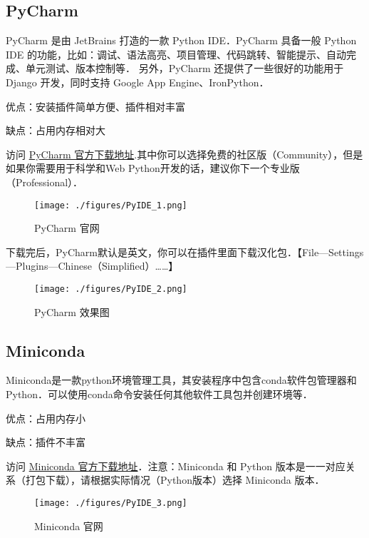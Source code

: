 
\begin{issues}
\issueTODO
\end{issues}

\subsection{PyCharm}

PyCharm 是由 JetBrains 打造的一款 Python IDE．PyCharm 具备一般 Python IDE 的功能，比如：调试、语法高亮、项目管理、代码跳转、智能提示、自动完成、单元测试、版本控制等． 另外，PyCharm 还提供了一些很好的功能用于 Django 开发，同时支持 Google App Engine、IronPython．

优点：安装插件简单方便、插件相对丰富

缺点：占用内存相对大

访问 \href{http://www.jetbrains.com/pycharm/download/}{PyCharm 官方下载地址}.其中你可以选择免费的社区版（Community），但是如果你需要用于科学和Web Python开发的话，建议你下一个专业版（Professional）．

\begin{figure}[ht]
\centering
\texttt{[image: ./figures/PyIDE\_1.png]}
\caption{PyCharm 官网} \label{PyIDE_fig1}
\end{figure}

下载完后，PyCharm默认是英文，你可以在插件里面下载汉化包．【File—Settings—Plugins—Chinese（Simplified）……】

\begin{figure}[ht]
\centering
\texttt{[image: ./figures/PyIDE\_2.png]}
\caption{PyCharm 效果图} \label{PyIDE_fig2}
\end{figure}

\subsection{Miniconda}

Miniconda是一款python环境管理工具，其安装程序中包含conda软件包管理器和Python．可以使用conda命令安装任何其他软件工具包并创建环境等．

优点：占用内存小

缺点：插件不丰富

访问 \href{https://docs.conda.io/en/latest/miniconda.html#}{Miniconda 官方下载地址}．注意：Miniconda 和 Python 版本是一一对应关系（打包下载），请根据实际情况（Python版本）选择 Miniconda 版本．

\begin{figure}[ht]
\centering
\texttt{[image: ./figures/PyIDE\_3.png]}
\caption{Miniconda 官网} \label{PyIDE_fig3}
\end{figure}

